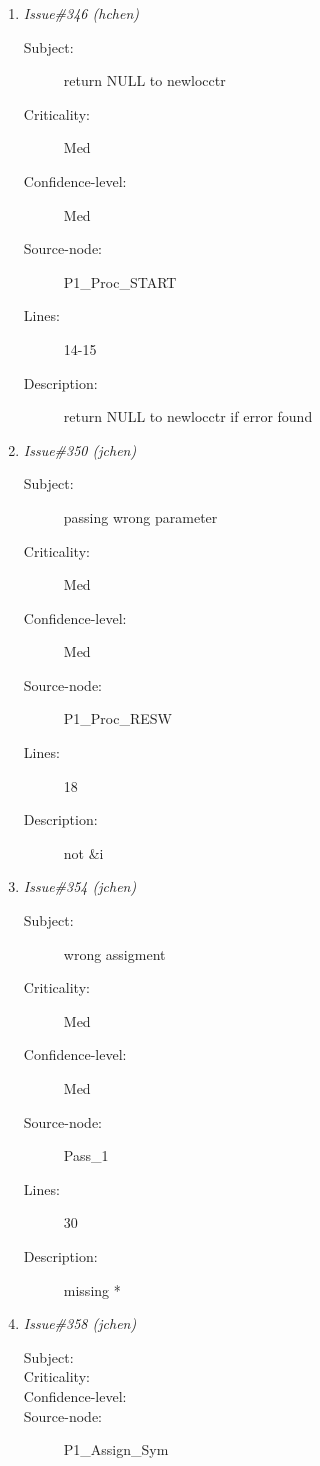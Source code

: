 \begin{enumerate}
\begin{description}
\item [Lines:] 26-27

\item [Description:] "F\\n" wrong
\end{description}
\item {\it Issue\#346 (hchen)}
\begin{description}
\item [Subject:] return NULL to newlocctr
\item [Criticality:] Med
\item [Confidence-level:] Med
\item [Source-node:] P1\_Proc\_START

\item [Lines:] 14-15

\item [Description:] return NULL to newlocctr if error found
\end{description}
\item {\it Issue\#350 (jchen)}
\begin{description}
\item [Subject:] passing wrong parameter
\item [Criticality:] Med
\item [Confidence-level:] Med
\item [Source-node:] P1\_Proc\_RESW

\item [Lines:] 18

\item [Description:] not \&i
\end{description}
\item {\it Issue\#354 (jchen)}
\begin{description}
\item [Subject:] wrong assigment
\item [Criticality:] Med
\item [Confidence-level:] Med
\item [Source-node:] Pass\_1

\item [Lines:] 30

\item [Description:] missing *
\end{description}
\item {\it Issue\#358 (jchen)}
\begin{description}
\item [Subject:] 
\item [Criticality:] 
\item [Confidence-level:] 
\item [Source-node:] P1\_Assign\_Sym


\end{description}
\end{enumerate}
